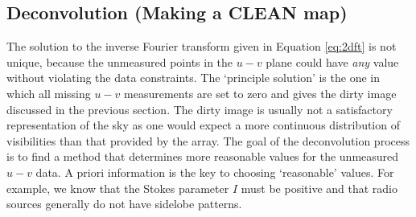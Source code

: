 \subsection{Deconvolution (Making a CLEAN map)}\label{subsec:4.3}
The solution to the inverse Fourier transform given in Equation \ref{eq:2dft}
 is not unique, because the unmeasured points in the $u-v$ plane could have \textit{any} value without violating the data constraints. The `principle solution' is the one in which all missing $u-v$ measurements are set to zero and gives the dirty image discussed in the previous section. The dirty image is usually not a satisfactory representation of the sky as one would expect a more continuous distribution of visibilities than that provided by the array. The goal of the deconvolution process is to find a method that determines more reasonable values for the unmeasured $u-v$ data. A priori information is the key to choosing `reasonable' values. For example, we know that the Stokes parameter $I$ must be positive and that radio sources generally do not have sidelobe patterns.
 
